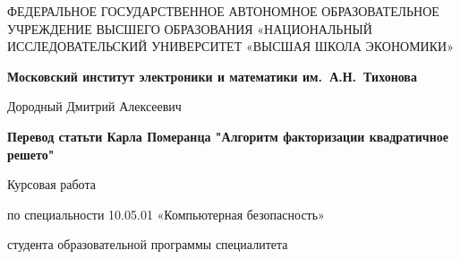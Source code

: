 \documentclass[a4paper,12pt]{report}
\begin{document}
\thispagestyle{empty}

\begin{center}

\sc
ФЕДЕРАЛЬНОЕ  ГОСУДАРСТВЕННОЕ АВТОНОМНОЕ
ОБРАЗОВАТЕЛЬНОЕ УЧРЕЖДЕНИЕ ВЫСШЕГО ОБРАЗОВАНИЯ
«НАЦИОНАЛЬНЫЙ ИССЛЕДОВАТЕЛЬСКИЙ УНИВЕРСИТЕТ
«ВЫСШАЯ ШКОЛА ЭКОНОМИКИ»
\end{center}

\begin{center}
\bf Московский институт электроники и математики им.~А.Н.~Тихонова
\end{center}

\vspace{1cm}

\begin{center}
Дородный Дмитрий Алексеевич
\end{center}

\vspace{1cm}

\begin{center}
\bf Перевод статьти Карла Померанца "Алгоритм факторизации квадратичное решето"
\end{center}

\vspace{10mm}

\begin{center}
Курсовая работа \par
по специальности 10.05.01 «Компьютерная безопасность» \par
студента образовательной программы специалитета
\end{center}

\vfill
\end{document}

